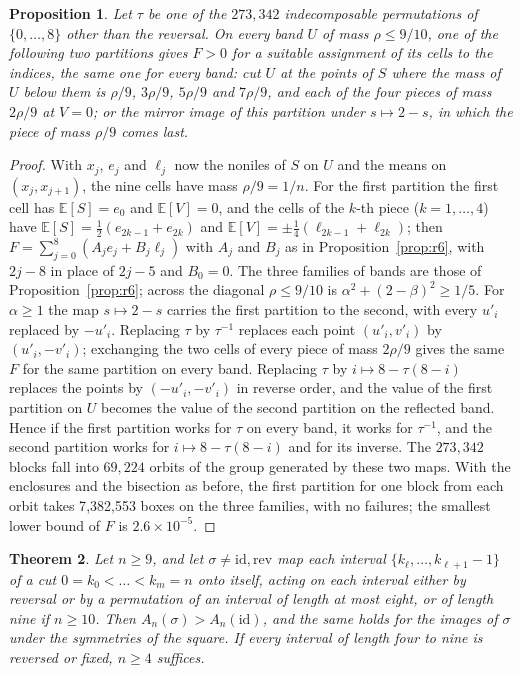 \documentclass[11pt]{amsart}
\newtheorem{theorem}{Theorem}[section]
\newtheorem{proposition}[theorem]{Proposition}
\theoremstyle{definition}
\theoremstyle{remark}
\numberwithin{equation}{section}
\newcommand{\E}{\mathbb{E}}
\begin{document}
\begin{proposition}\label{prop:r9}
Let $\tau$ be one of the $273{,}342$ indecomposable permutations of $\{0,\dots,8\}$ other than the reversal. On every
band $U$ of mass $\rho\le9/10$, one of the following two partitions gives $F>0$ for a suitable assignment of its cells
to the indices, the same one for every band: cut $U$ at the points of $S$ where the mass of $U$ below them is $\rho/9$,
$3\rho/9$, $5\rho/9$ and $7\rho/9$, and each of the four pieces of mass $2\rho/9$ at $V=0$; or the mirror image of this
partition under $s\mapsto2-s$, in which the piece of mass $\rho/9$ comes last.
\end{proposition}

\begin{proof}
With $x_j$, $e_j$ and $\ell_j$ now the noniles of $S$ on $U$ and the means on $(x_j,x_{j+1})$, the nine cells have mass
$\rho/9=1/n$. For the first partition the first cell has $\E[S]=e_0$ and $\E[V]=0$, and the cells of the $k$-th piece
($k=1,\dots,4$) have $\E[S]=\frac12(e_{2k-1}+e_{2k})$ and $\E[V]=\pm\frac14(\ell_{2k-1}+\ell_{2k})$; then
$F=\sum_{j=0}^{8}(A_je_j+B_j\ell_j)$ with $A_j$ and $B_j$ as in Proposition~\ref{prop:r6}, with $2j-8$ in place of $2j-5$
and $B_0=0$. The three families of bands are those of Proposition~\ref{prop:r6}; across the diagonal $\rho\le9/10$ is
$\alpha^2+(2-\beta)^2\ge1/5$. For $\alpha\ge1$ the map $s\mapsto2-s$ carries the first partition to the second, with
every $u'_i$ replaced by $-u'_i$. Replacing $\tau$ by $\tau^{-1}$ replaces each point $(u'_i,v'_i)$ by $(u'_i,-v'_i)$;
exchanging the two cells of every piece of mass $2\rho/9$ gives the same $F$ for the same partition on every band.
Replacing $\tau$ by $i\mapsto8-\tau(8-i)$ replaces the points by $(-u'_i,-v'_i)$ in reverse order, and the value of the
first partition on $U$ becomes the value of the second partition on the reflected band. Hence if the first partition
works for $\tau$ on every band, it works for $\tau^{-1}$, and the second partition works for $i\mapsto8-\tau(8-i)$ and
for its inverse. The $273{,}342$ blocks fall into $69{,}224$ orbits of the group generated by these two maps. With the
enclosures and the bisection as before, the first partition for one block from each orbit takes 7{,}382{,}553 boxes on
the three families, with no failures; the smallest lower bound of $F$ is $2.6\times10^{-5}$.
\end{proof}

\begin{theorem}\label{thm:windows}
Let $n\ge9$, and let $\sigma\ne\mathrm{id},\mathrm{rev}$ map each interval $\{k_\ell,\dots,k_{\ell+1}-1\}$ of a cut
$0=k_0<\dots<k_m=n$ onto itself, acting on each interval either by reversal or by a permutation of an interval of
length at most eight, or of length nine if $n\ge10$. Then $A_n(\sigma)>A_n(\mathrm{id})$, and the same holds for the
images of $\sigma$ under the symmetries of the square. If every interval of length four to nine is reversed or fixed,
$n\ge4$ suffices.
\end{theorem}
\end{document}
